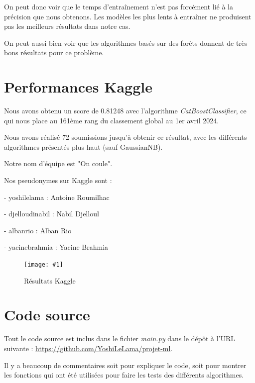 \documentclass[a4paper]{article}
\newcommand{\illustration}[3]{
    \begin{figure}[h!]
        \centering
        \texttt{[image: \#1]}
        \caption{#2}
    \end{figure}
}
\begin{document}
    On peut donc voir que le temps d'entraînement n'est pas forcément lié à la précision que nous obtenons.
    Les modèles les plus lents à entraîner ne produisent pas les meilleurs résultats dans notre cas.

    On peut aussi bien voir que les algorithmes basés sur des forêts donnent de très bons résultats pour ce
    problème.

    \newpage

    \section{Performances Kaggle}

    Nous avons obtenu un score de 0.81248 avec l'algorithme {\it CatBoostClassifier}, ce qui nous place au 161ème rang du classement global au 1er avril 2024.

    Nous avons réalisé 72 soumissions jusqu'à obtenir ce résultat, avec les différents algorithmes présentés plus haut (sauf GaussianNB).

    Notre nom d'équipe est "On coule".

    Nos pseudonymes sur Kaggle sont :

    - yoshilelama : Antoine Roumilhac
    
    - djelloudinabil : Nabil Djelloul

    - albanrio : Alban Rio

    - yacinebrahmia : Yacine Brahmia

    \illustration{images/kaggle.png}{Résultats Kaggle}{\textwidth}

    \section{Code source}

    Tout le code source est inclus dans le fichier {\it main.py} dans le dépôt à l'URL suivante : 
    \href{https://github.com/YoshiLeLama/projet-ml}{https://github.com/YoshiLeLama/projet-ml}.

    Il y a beaucoup de commentaires soit pour expliquer le code, soit pour montrer les 
    fonctions qui ont été utilisées pour faire les tests des différents algorithmes.
\end{document}

